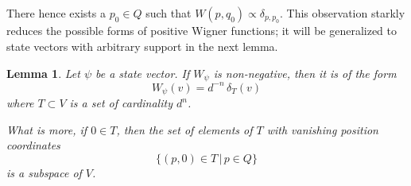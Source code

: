 \documentclass[aps,twocolumn,floatfix]{revtex4}
\newtheorem{lemma}[theorem]{Lemma}
\begin{document}
There hence exists a $p_0\in Q$ such that
$W(p,q_0)\propto\delta_{p,p_0}$. This observation starkly reduces the
possible forms of positive Wigner functions; it will be generalized to
state vectors with arbitrary support in the next lemma.

\begin{lemma}\label{lmWignerConstant}
	Let $\psi$ be a state vector. If $W_\psi$ is non-negative, then it
	is of the form
	\begin{equation*}
		W_\psi(v) = d^{-n}\,\delta_T(v)
	\end{equation*}
	where $T\subset V$ is a set of cardinality $d^n$. 
	
	What is more, if $0\in T$, then the set of elements of $T$ with
	vanishing position coordinates
	\begin{equation*}
		\{(p,0)\in T \,|\,  p \in Q\}
	\end{equation*}
	is a subspace of $V$.
\end{lemma}
\end{document}
